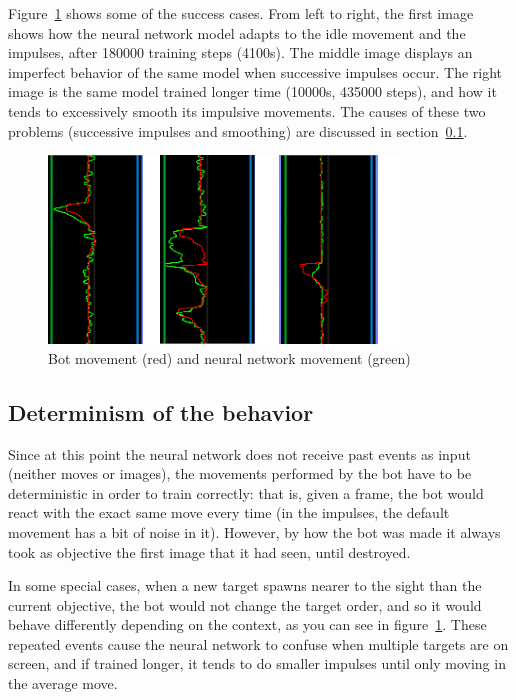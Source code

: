 Figure~\ref{fig:graphTR} shows some of the success cases. From left to right, the first image shows how the neural network model adapts to the idle movement and the impulses, after 180000 training steps (4100s). The middle image displays an imperfect behavior of the same model when successive impulses occur. The right image is the same model trained longer time (10000s, 435000 steps), and how it tends to excessively smooth its impulsive movements. The causes of these two problems (successive impulses and smoothing) are discussed in section~\ref{sec:determ}.
\begin{figure}[h]
  \centering
		\includegraphics[width=.9\textwidth]{img/graphsTR.png}
  \caption{Bot movement (red) and neural network movement (green)}
  \label{fig:graphTR}
\end{figure}

\subsection{Determinism of the behavior}
\label{sec:determ}

Since at this point the neural network does not receive past events as input (neither moves or images), the movements performed by the bot have to be deterministic in order to train correctly: that is, given a frame, the bot would react with the exact same move every time (in the impulses, the default movement has a bit of noise in it). However, by how the bot was made it always took as objective the first image that it had seen, until destroyed.

In some special cases, when a new target spawns nearer to the sight than the current objective, the bot would not change the target order, and so it would behave differently depending on the context, as you can see in figure~\ref{fig:graphTR}. These repeated events cause the neural network to confuse when multiple targets are on screen, and if trained longer, it tends to do smaller impulses until only moving in the average move.

